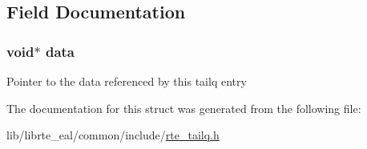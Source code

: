 \subsection{Field Documentation}
\hypertarget{structrte__tailq__entry_a735984d41155bc1032e09bece8f8d66d}{}
\subsubsection[{data}]{\setlength{\rightskip}{0pt plus 5cm}void$\ast$ data}\label{structrte__tailq__entry_a735984d41155bc1032e09bece8f8d66d}
Pointer to the data referenced by this tailq entry 

The documentation for this struct was generated from the following file\+:\begin{DoxyCompactItemize}
\item 
lib/librte\+\_\+eal/common/include/\hyperlink{rte__tailq_8h}{rte\+\_\+tailq.\+h}\end{DoxyCompactItemize}

